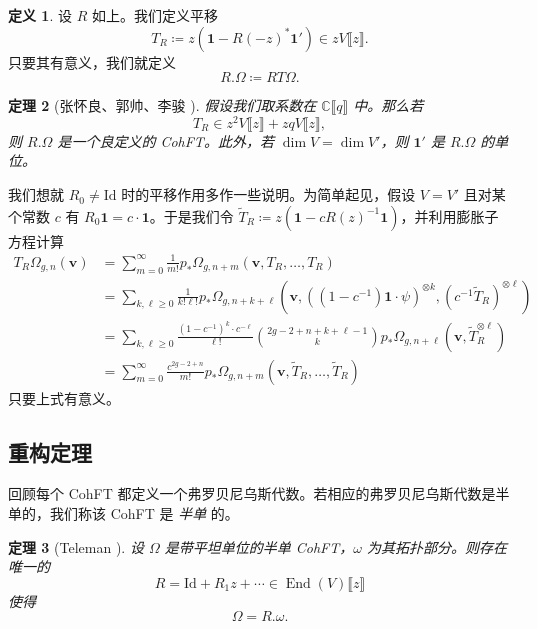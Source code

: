 \documentclass{amsart}
\newtheorem{thm}{定理}[section]
\theoremstyle{definition}
\newtheorem{defn}[thm]{定义}
\theoremstyle{remark}
\theoremstyle{plain}
\theoremstyle{definition}
\theoremstyle{remark}
\newcommand{\C}{\mathbb{C}}
\newcommand{\mbf}[1]{\mathbf{#1}}
\newcommand{\bv}{\mbf{v}}
\newcommand{\mr}[1]{\mathrm{#1}}
\newcommand{\1}{\mathbf{1}}
\newcommand{\2}{\mathbf{2}}
\newcommand{\3}{\mathbf{3}}
\newcommand{\ps}[1]{\llbracket #1 \rrbracket}
\DeclareMathOperator{\End}{End}
\begin{document}
\begin{defn}
    设 $R$ 如上。我们定义平移
    \[ T_R \coloneqq z (\1 - R(-z)^* \1') \in z V\ps{z}. \]
    只要其有意义，我们就定义
    \[ R.\Omega \coloneqq RT\Omega. \]
\end{defn}

\begin{thm}[张怀良、郭帅、李骏 {\cite[Theorem~2.7]{CGL2026}}]
    假设我们取系数在 $\C\ps{q}$ 中。那么若
    \[ T_R \in z^2 V \ps{z} + zq V \ps{z}, \]
    则 $R.\Omega$ 是一个良定义的 CohFT。此外，若 $\dim V = \dim V'$，则 $\1'$ 是 $R.\Omega$ 的单位。
\end{thm}

我们想就 $R_0 \neq \mr{Id}$ 时的平移作用多作一些说明。为简单起见，假设 $V = V'$ 且对某个常数 $c$ 有 $R_0 \1 = c \cdot \1$。于是我们令 $\tilde{T}_R \coloneqq z( \1 - c R(z)^{-1} \1)$，并利用膨胀子方程计算
\begin{align*}
    T_R \Omega_{g,n}(\bv) &= \sum_{m=0}^{\infty} \frac{1}{m!} p_*\Omega_{g,n+m}(\bv, T_R, \ldots, T_R) \\
    &= \sum_{k,\ell \geq 0} \frac{1}{k!\ell!} p_* \Omega_{g,n+k+\ell}(\bv, ( (1-c^{-1})\1 \cdot \psi )^{\otimes k}, ( c^{-1} \tilde{T}_R )^{\otimes \ell}) \\
    &= \sum_{k,\ell \geq 0} \frac{(1-c^{-1})^k \cdot c^{-\ell}}{\ell!} \binom{2g-2+n+k+\ell-1}{k} p_* \Omega_{g,n+\ell}(\bv, \tilde{T}_R^{\otimes \ell}) \\
    &= \sum_{m=0}^{\infty} \frac{c^{2g-2+n}}{m!} p_* \Omega_{g,n+m}(\bv, \tilde{T}_R, \ldots, \tilde{T}_R)
\end{align*}
只要上式有意义。


\subsection{重构定理}%
\label{sub:Reconstruction theorem}

回顾每个 CohFT 都定义一个弗罗贝尼乌斯代数。若相应的弗罗贝尼乌斯代数是半单的，我们称该 CohFT 是 \textit{半单} 的。

\begin{thm}[Teleman {\cite{Teleman2012}}]%
\label{thm:teleman}
    设 $\Omega$ 是带平坦单位的半单 CohFT，$\omega$ 为其拓扑部分。则存在唯一的
    \[ R = \mr{Id} + R_1 z + \cdots \in \End(V)\ps{z} \]
    使得
    \[ \Omega = R.\omega. \]
\end{thm}
\end{document}
